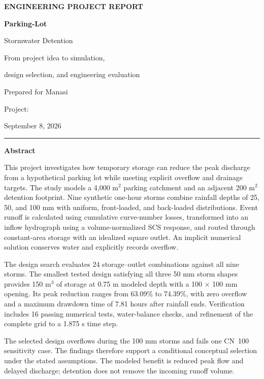 \documentclass[11pt,letterpaper]{article}
\newcommand{\file}[1]{\texttt{\detokenize{#1}}}
\begin{document}
\hypersetup{pageanchor=false}
\begin{titlepage}
\thispagestyle{empty}
{\sffamily\color{teal}\bfseries ENGINEERING PROJECT REPORT\par}
\vspace{0.35in}
{\sffamily\bfseries\color{ink}\fontsize{29}{34}\selectfont
Parking-Lot\par Stormwater Detention\par}
\vspace{0.18in}
{\sffamily\Large\color{muted}From project idea to simulation,\par design selection, and engineering evaluation\par}
\vspace{0.28in}
{\large Prepared for Manasi\par}
{\color{muted}Project: \file{manasi_project}\par September 8, 2026\par}
\vspace{0.2in}
{\color{teal}\rule{\linewidth}{1.2pt}}

\vspace{0.12in}
{\sffamily\large\bfseries\color{ink}Abstract\par}
This project investigates how temporary storage can reduce the peak discharge
from a hypothetical parking lot while meeting explicit overflow and drainage
targets. The study models a 4,000 m$^2$ parking catchment and an adjacent
200 m$^2$ detention footprint. Nine synthetic one-hour storms combine rainfall
depths of 25, 50, and 100 mm with uniform, front-loaded, and back-loaded
distributions. Event runoff is calculated using cumulative curve-number
losses, transformed into an inflow hydrograph using a volume-normalized SCS
response, and routed through constant-area storage with an idealized square
outlet. An implicit numerical solution conserves water and explicitly records
overflow.

The design search evaluates 24 storage--outlet combinations against all nine
storms. The smallest tested design satisfying all three 50 mm storm shapes
provides 150 m$^3$ of storage at 0.75 m modeled depth with a
100 $\times$ 100 mm opening. Its peak reduction ranges from 63.09\% to
74.39\%, with zero overflow and a maximum drawdown time of 7.81 hours after
rainfall ends. Verification includes 16 passing numerical tests, water-balance
checks, and refinement of the complete grid to a 1.875 s time step.

The selected design overflows during the 100 mm storms and fails one
CN~100 sensitivity case. The findings therefore support a conditional
conceptual selection under the stated assumptions. The modeled benefit is
reduced peak flow and delayed discharge; detention does not remove the
incoming runoff volume.


\end{titlepage}
\end{document}
